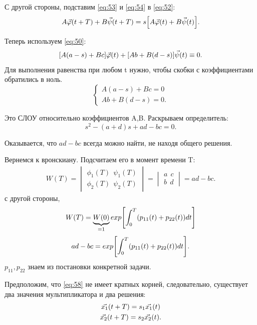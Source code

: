 С другой стороны, подставим \eqref{eq:53} и \eqref{eq:54} в \eqref{eq:52}:
\begin{equation}
	A\vec{\varphi}(t+T)+B\vec{\psi}(t+T)=s\qty[A\vec{\varphi}(t)+B\vec{\psi}(t)].
	\label{eq:55}	
\end{equation}

Теперь используем \eqref{eq:50}:
\begin{equation}
	\qty[A(a-s)+Bc]\vec{\varphi}(t)+\qty[Ab+B(d-s)]\vec{\psi}(t) \equiv 0.
	\label{eq:56}	
\end{equation}
Для выполнения равенства при любом t нужно, чтобы скобки с коэффициентами обратились в ноль.
\begin{equation}
	\begin{cases}
		A(a-s)+Bc=0 \\
		Ab+B(d-s)=0.		
	\end{cases}
	\label{eq:57}
\end{equation}

Это СЛОУ относительно коэффициентов A,B. Раскрываем определитель:
\begin{equation}
	s^2-(a+d)s+ad-bc=0.
	\label{eq:58}	
\end{equation}

Оказывается, что $ad-bc$ всегда можно найти, не находя общего решения.

Вернемся к вронскиану. Подсчитаем его в момент времени T:
\begin{gather*}
	W(T)= 
	\begin{vmatrix}
		\phi_1(T) ~~\psi_1(T) \\ 
		\phi_2(T) ~~\psi_2(T)
	\end{vmatrix}
	=
	\begin{vmatrix}
		a ~~c \\ 
		b ~~d
	\end{vmatrix}
	=ad-bc.
\end{gather*}
с другой стороны,
\begin{eqnarray*}
	W(T)=\underbrace{W(0)}_{\text{=1}}exp\qty[\int_0^T(p_{11}(t)+p_{22}(t))dt] \\
\end{eqnarray*}
\begin{equation}
	ad-bc=exp\qty[\int_0^T(p_{11}(t)+p_{22}(t))dt].
	\label{eq:59}
\end{equation}
$p_11, p_22$ знаем из постановки конкретной задачи.

Предположим, что \eqref{eq:58} не имеет кратных корней, следовательно, существует два значения мультипликатора и два решения:
\begin{gather}
	\vec{x_1}(t+T)=s_1\vec{x_1}(t) \notag \\ 
	\vec{x_2}(t+T)=s_2\vec{x_2}(t).		
	\label{eq:60}
\end{gather}

